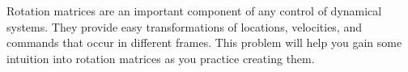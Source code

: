 
Rotation matrices are an important component of any control of dynamical systems. They provide easy transformations of locations, velocities, and commands that occur in different frames. This problem will help you gain some intuition into rotation matrices as you practice creating them.

\vspace*{1cm}
